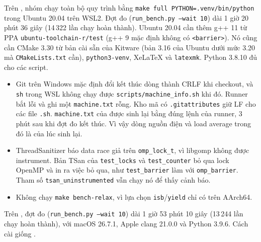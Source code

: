 Trên , nhóm chạy toàn bộ quy trình bằng \texttt{make full PYTHON=.venv/bin/python}
trong Ubuntu 20.04 trên WSL2. Đợt đo (\texttt{run\_bench.py --wait 10}) dài 1 giờ 20 phút 36 giây
(14\,322 lần chạy hoàn thành). Ubuntu 20.04 cần thêm g++ 11 từ PPA \texttt{ubuntu-toolchain-r/test} (g++ 9 mặc
định không có \texttt{<barrier>}). Nó cũng cần CMake 3.30 từ bản cài sẵn của Kitware (bản 3.16 của Ubuntu dưới mức
3.20 mà \texttt{CMakeLists.txt} cần), \texttt{python3-venv}, XeLaTeX và \texttt{latexmk}. Python 3.8.10
đủ cho các script.
\begin{itemize}[nosep]
  \item Git trên Windows mặc định đổi kết thúc dòng thành CRLF khi checkout, và \texttt{sh} trong WSL
    không chạy được \texttt{scripts/machine\_info.sh} khi đó. Runner bắt lỗi và ghi một
    \texttt{machine.txt} rỗng. Kho mã có \texttt{.gitattributes} giữ LF cho các file \texttt{.sh}.
    \texttt{machine.txt} của  được sinh lại bằng đúng lệnh của runner, 3 phút sau khi đợt
    đo kết thúc. Vì vậy dòng nguồn điện và load average trong đó là của lúc sinh lại.
  \item ThreadSanitizer báo data race giả trên \texttt{omp\_lock\_t}, vì libgomp không được instrument.
    Bản TSan của \texttt{test\_locks} và \texttt{test\_counter} bỏ qua lock OpenMP và in ra việc bỏ
    qua, như \texttt{test\_barrier} làm với \texttt{omp\_barrier}. Tham số \texttt{tsan\_uninstrumented}
    vẫn chạy nó để thấy cảnh báo.
  \item Không chạy \texttt{make bench-relax}, vì lựa chọn \texttt{isb}/\texttt{yield} chỉ có trên AArch64.
\end{itemize}
Trên , đợt đo (\texttt{run\_bench.py --wait 10}) dài 1 giờ 53 phút 10 giây (13\,244 lần
chạy hoàn thành), với macOS 26.7.1, Apple clang 21.0.0 và Python 3.9.6. Cách cài giống .
